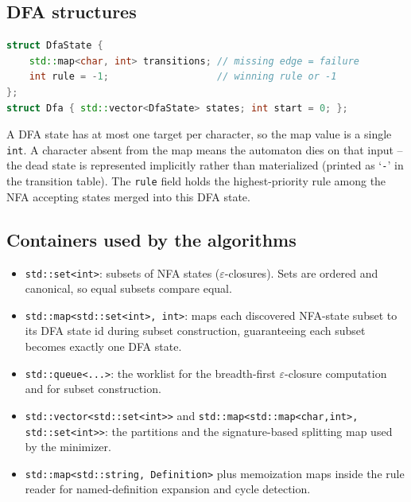 \documentclass[11pt,a4paper]{article}
\begin{document}
\subsection{DFA structures}
\begin{lstlisting}[basicstyle=\ttfamily\small,language=C++]
struct DfaState {
    std::map<char, int> transitions; // missing edge = failure
    int rule = -1;                   // winning rule or -1
};
struct Dfa { std::vector<DfaState> states; int start = 0; };
\end{lstlisting}
A DFA state has at most one target per character, so the map value is a single
\texttt{int}. A character absent from the map means the automaton dies on that
input -- the dead state is represented implicitly rather than materialized
(printed as `\texttt{-}' in the transition table). The \texttt{rule} field holds
the highest-priority rule among the NFA accepting states merged into this DFA
state.

\subsection{Containers used by the algorithms}
\begin{itemize}
    \item \texttt{std::set<int>}: subsets of NFA states ($\varepsilon$-closures).
          Sets are ordered and canonical, so equal subsets compare equal.
    \item \texttt{std::map<std::set<int>, int>}: maps each discovered NFA-state
          subset to its DFA state id during subset construction, guaranteeing
          each subset becomes exactly one DFA state.
    \item \texttt{std::queue<...>}: the worklist for the breadth-first
          $\varepsilon$-closure computation and for subset construction.
    \item \texttt{std::vector<std::set<int>>} and
          \texttt{std::map<std::map<char,int>, std::set<int>>}: the partitions and
          the signature-based splitting map used by the minimizer.
    \item \texttt{std::map<std::string, Definition>} plus memoization maps inside
          the rule reader for named-definition expansion and cycle detection.
\end{itemize}
\end{document}
